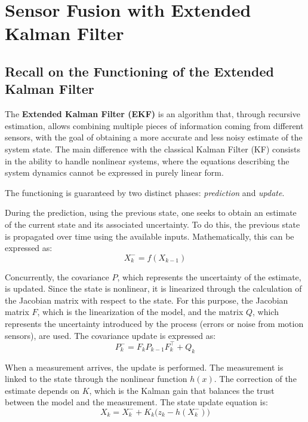 \chapter[Sensor Fusion with EKF]{Sensor Fusion with Extended Kalman Filter}
\section[Recall on the Functioning of the EKF]{Recall on the Functioning of the Extended Kalman Filter}

The  \textbf{Extended Kalman Filter (EKF)} is an algorithm that, through recursive estimation, allows combining multiple pieces of information coming from different sensors, with the goal of obtaining a more accurate and less noisy estimate of the system state. The main difference with the classical Kalman Filter (KF) consists in the ability to handle nonlinear systems, where the equations describing the system dynamics cannot be expressed in purely linear form.

The functioning is guaranteed by two distinct phases: \textit{prediction} and \textit{update}.  

During the prediction, using the previous state, one seeks to obtain an estimate of the current state and its associated uncertainty. To do this, the previous state is propagated over time using the available inputs. Mathematically, this can be expressed as:
\begin{equation}
X_k^- = f(X_{k-1})
\end{equation}

Concurrently, the covariance $P$, which represents the uncertainty of the estimate, is updated. Since the state is nonlinear, it is linearized through the calculation of the Jacobian matrix with respect to the state. For this purpose, the Jacobian matrix $F$, which is the linearization of the model, and the matrix $Q$, which represents the uncertainty introduced by the process (errors or noise from motion sensors), are used. The covariance update is expressed as:
\begin{equation}
P_k^- = F_k P_{k-1} F_k^\top + Q_k
\end{equation}

When a measurement arrives, the update is performed. The measurement is linked to the state through the nonlinear function $h(x)$. The correction of the estimate depends on $K$, which is the Kalman gain that balances the trust between the model and the measurement. The state update equation is:
\begin{equation}
X_k = X_k^- + K_k \big( z_k - h(X_k^-) \big)
\end{equation}

